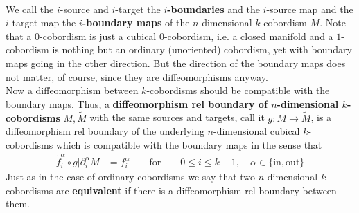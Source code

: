 \\
We call the $i$-source and $i$-target the \textbf{$i$-boundaries} and the $i$-source map and the $i$-target map the \textbf{$i$-boundary maps} of the $n$-dimensional $k$-cobordism $M$. Note that a $0$-cobordism is just a cubical $0$-cobordism, i.e. a closed manifold and a $1$-cobordism is nothing but an ordinary (unoriented) cobordism, yet with boundary maps going in the other direction. But the direction of the boundary maps does not matter, of course, since they are diffeomorphisms anyway.
\\
Now a diffeomorphism between $k$-cobordisms should be compatible with the boundary maps. Thus, a \textbf{diffeomorphism rel boundary of $n$-dimensional $k$-cobordisms} $M,\tilde{M}$ with the same sources and targets, call it $g \colon M \to \tilde{M}$, is a diffeomorphism rel boundary of the underlying $n$-dimensional cubical $k$-cobordisms which is compatible with the boundary maps in the sense that
\begin{align*}
  \tilde{f}_{i}^{\alpha}
  \circ
  g
  \vert
  \partial_{i}^{\alpha}
  M
  &=
  f_{i}^{\alpha}
  \qquad
  \text{for}
  \qquad
  0
  \leq
  i
  \leq
  k-1
  ,\quad
  \alpha
  \in
  \lbrace
    \mathrm{in}
    ,
    \mathrm{out}
  \rbrace
\end{align*}
Just as in the case of ordinary cobordisms we say that two $n$-dimensional $k$-cobordisms are \textbf{equivalent} if there is a diffeomorphism rel boundary between them.
\\
